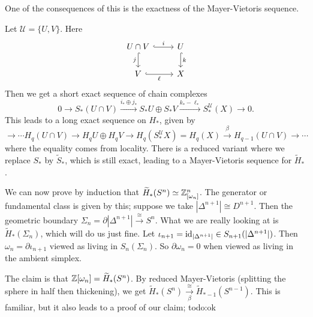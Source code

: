         One of the consequences of this is the exactness of the Mayer-Vietoris sequence.
        \begin{cor}
            Let $\mathcal{U} =\{U,V\} $. Here 
\[
\begin{tikzcd}
U\cap  V \arrow[d, "j"', hook] \arrow[r, "i", hook] & U \arrow[d, "k", hook] \\
V \arrow[r, "\ell"', hook]                          & X                     
\end{tikzcd}
\] Then we get a short exact sequence of chain complexes \[
                0 \longrightarrow S_*(U \cap V) \xrightarrow{i_*\oplus j_*} S_*U \oplus S_*V \xrightarrow{k_*-\ell_*}  S_*^{\mathcal{U} }(X) \longrightarrow 0.
            \] This leads to a long exact sequence on $H_*$, given by \[
            \to  \cdots H_q(U \cap V) \to H_qU \oplus H_qV \to H_q(S_*^{\mathcal{U} }X)=H_q(X) \xrightarrow{\beta } H_{q-1}(U \cap V)\to \cdots 
        \] where the equality comes from locality. There is a reduced variant where we replace $S_*$ by $\widetilde S_*$, which is still exact, leading to a Mayer-Vietoris sequence for $\widetilde H_*$.
        \end{cor}
        \begin{example}
            We can now prove by induction that $\widetilde H_*(S^n )\simeq  \mathbb{Z}^n_{[\omega_n ]} $. The generator or fundamental class is given by this; suppose we take $|\Delta ^{n+1}| \cong D^{n+1}$. Then the geometric boundary $\Sigma_n =\partial |\Delta ^{n+1}|\xrightarrow{\cong} S^n $. What we are really looking at is $\widetilde H_*(\Sigma_n )$, which will do us just fine. Let $\iota _{n+1}=\operatorname{id} _{|\Delta ^{n+1}|}\in  S_{n+1}(|\Delta ^{n+1}|)$. Then $\omega_n =\partial \iota_{n+1} $ viewed as living in $S_n (\Sigma _n )$. So $\partial \omega_n =0$ when viewed as living in the ambient simplex. 

            The claim is that $\mathbb{Z}[\omega_n ]=\widetilde H_*(S^n )$. By reduced Mayer-Vietoris (splitting the sphere in half then thickening), we get $\widetilde H_*(S^n ) \underset{\beta }{\xrightarrow{\cong}} \widetilde H_{*-1}(S^{n-1}) $. This is familiar, but it also leads to a proof of our claim; {\color{red}todo:ok} 
        \end{example}
